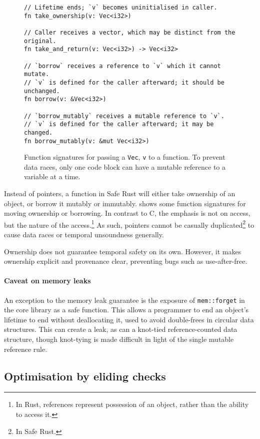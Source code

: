 \documentclass[dissertation.tex]{subfiles}
\begin{document}
\begin{figure}[ht]
\begin{lstlisting}
// Lifetime ends; `v` becomes uninitialised in caller.
fn take_ownership(v: Vec<i32>)

// Caller receives a vector, which may be distinct from the original.
fn take_and_return(v: Vec<i32>) -> Vec<i32>

// `borrow` receives a reference to `v` which it cannot mutate.
// `v` is defined for the caller afterward; it should be unchanged.
fn borrow(v: &Vec<i32>)

// `borrow_mutably` receives a mutable reference to `v`.
// `v` is defined for the caller afterward; it may be changed.
fn borrow_mutably(v: &mut Vec<i32>)
\end{lstlisting}
\caption{ Function signatures for passing a
\texttt{Vec}, \texttt{v} to a function. To prevent data races, only one
code block can have a mutable reference to a variable at a time.}
\label{lst:rust-ownership}
\end{figure}

Instead of pointers, a function in Safe Rust will either take ownership
of an object, or borrow it mutably or immutably.
 shows some function signatures for
moving ownership or borrowing.
In contrast to C, the emphasis is not on access, but the nature of the
access.\footnote{In Rust, references represent possession of an object,
rather than the ability to access it.}
As such, pointers cannot be casually duplicated\footnote{In Safe Rust.}
to cause data races or temporal unsoundness generally.

Ownership does not guarantee temporal safety on its own.
However, it makes ownership explicit and provenance clear, preventing
bugs such as use-after-free.

\paragraph{Caveat on memory leaks}
An exception to the memory leak guarantee is the exposure of
\texttt{mem::forget} in the core library as a safe function.
This allows a programmer to end an object's lifetime to end without
deallocating it, used to avoid double-frees in circular data structures.
This can create a leak, as can a knot-tied reference-counted data
structure, though knot-tying is made difficult in light of the single
mutable reference rule.


\subsection{Optimisation by eliding checks}
\label{sec:rust-elision}
\end{document}
